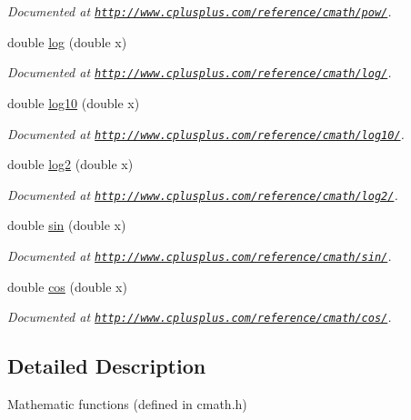 \begin{DoxyCompactItemize}
\begin{DoxyCompactList}\small\item\em Documented at \href{http://www.cplusplus.com/reference/cmath/pow/}{\tt http\-://www.\-cplusplus.\-com/reference/cmath/pow/}. \end{DoxyCompactList}\item 
\hypertarget{group__math_gadb302c9aafbaa5e180d9f60ee954bb82}{double \hyperlink{group__math_gadb302c9aafbaa5e180d9f60ee954bb82}{log} (double x)}\label{group__math_gadb302c9aafbaa5e180d9f60ee954bb82}

\begin{DoxyCompactList}\small\item\em Documented at \href{http://www.cplusplus.com/reference/cmath/log/}{\tt http\-://www.\-cplusplus.\-com/reference/cmath/log/}. \end{DoxyCompactList}\item 
\hypertarget{group__math_ga6572e82a4891917a9ba7fb2a964f8182}{double \hyperlink{group__math_ga6572e82a4891917a9ba7fb2a964f8182}{log10} (double x)}\label{group__math_ga6572e82a4891917a9ba7fb2a964f8182}

\begin{DoxyCompactList}\small\item\em Documented at \href{http://www.cplusplus.com/reference/cmath/log10/}{\tt http\-://www.\-cplusplus.\-com/reference/cmath/log10/}. \end{DoxyCompactList}\item 
\hypertarget{group__math_ga38bd88274dc5594b4826fd60c8054c8e}{double \hyperlink{group__math_ga38bd88274dc5594b4826fd60c8054c8e}{log2} (double x)}\label{group__math_ga38bd88274dc5594b4826fd60c8054c8e}

\begin{DoxyCompactList}\small\item\em Documented at \href{http://www.cplusplus.com/reference/cmath/log2/}{\tt http\-://www.\-cplusplus.\-com/reference/cmath/log2/}. \end{DoxyCompactList}\item 
\hypertarget{group__math_gaad4af25633b071b0e2cdb8ebd87eca77}{double \hyperlink{group__math_gaad4af25633b071b0e2cdb8ebd87eca77}{sin} (double x)}\label{group__math_gaad4af25633b071b0e2cdb8ebd87eca77}

\begin{DoxyCompactList}\small\item\em Documented at \href{http://www.cplusplus.com/reference/cmath/sin/}{\tt http\-://www.\-cplusplus.\-com/reference/cmath/sin/}. \end{DoxyCompactList}\item 
\hypertarget{group__math_ga5e7b53a694b3cf0f2d7debd444140fbd}{double \hyperlink{group__math_ga5e7b53a694b3cf0f2d7debd444140fbd}{cos} (double x)}\label{group__math_ga5e7b53a694b3cf0f2d7debd444140fbd}

\begin{DoxyCompactList}\small\item\em Documented at \href{http://www.cplusplus.com/reference/cmath/cos/}{\tt http\-://www.\-cplusplus.\-com/reference/cmath/cos/}. \end{DoxyCompactList}\end{DoxyCompactItemize}


\subsection{Detailed Description}
Mathematic functions (defined in cmath.\-h) 